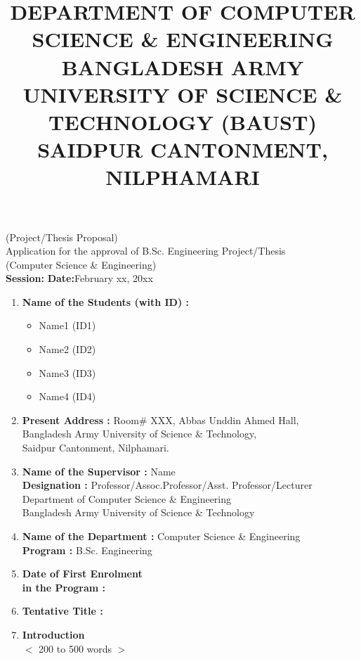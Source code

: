 \documentclass[11pt,a4paper]{article}
\title{\large{DEPARTMENT OF COMPUTER SCIENCE \& ENGINEERING}\\
\small{BANGLADESH ARMY UNIVERSITY OF SCIENCE \& TECHNOLOGY (BAUST)}\\
\small{SAIDPUR CANTONMENT, NILPHAMARI}\vspace{.5cm} }
\date{}
\author{}
\begin{document}
\maketitle
\centering(Project/Thesis Proposal)\\ \vspace{.5cm}
Application for the approval of B.Sc. Engineering Project/Thesis\\
(Computer Science \& Engineering)\\ \vspace{0.5cm}
\noindent
\textbf{Session:} \hfill \textbf{Date:}February xx, 20xx\\

\begin{enumerate}
    \item \textbf{Name of the Students (with ID) :}
 
    \begin{itemize}
        \item Name1 (ID1)
        \item Name2 (ID2)
        \item Name3 (ID3)
        \item Name4 (ID4)
    \end{itemize}
    \item \textbf{Present Address :} Room\# XXX, Abbas Unddin Ahmed Hall,\\
\hspace{3.35cm} Bangladesh Army University of Science \& Technology,\\
\hspace{3.35cm} Saidpur Cantonment, Nilphamari.
    \item \textbf{Name of the Supervisor :} Name\\
    \textbf{Designation \hspace{.8cm}:} Professor/Assoc.Professor/Asst. Professor/Lecturer\\
\hspace{3.35cm}Department of Computer Science \& Engineering\\
\hspace{3.35cm}Bangladesh Army University of Science \& Technology

\item \textbf{Name of the Department :} Computer Science \& Engineering\\
\textbf{Program \hspace{3.2cm}:} B.Sc. Engineering
\item \textbf{Date of First Enrolment\\
in the Program \hspace{2cm}:}
\item \textbf{Tentative Title \hspace{2.10cm}:} %
\item \textbf{Introduction}\\
$<$ 200 to 500 words $>$\\




\end{enumerate}
\end{document}
